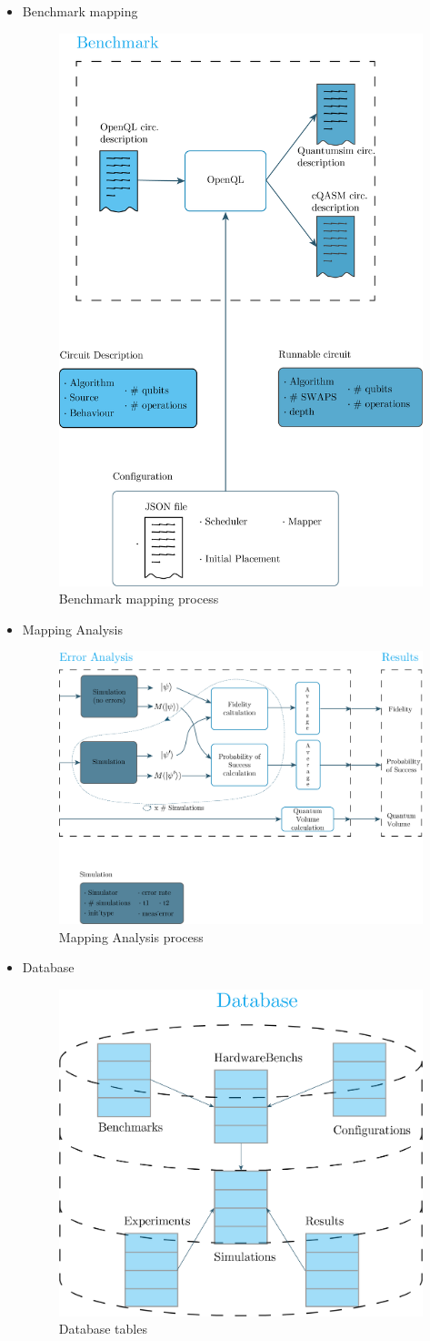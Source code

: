 \begin{itemize}
\item Benchmark mapping
\label{sec:org53f1364}

\begin{figure}[htbp]
\centering
\includegraphics[width=.5\textwidth]{figures/benchmark_object.png}
\caption{\label{fig:org5e30ca0}
Benchmark mapping process}
\end{figure}

\item Mapping Analysis
\label{sec:orgee2a61e}

\begin{figure}[htbp]
\centering
\includegraphics[width=.75\textwidth]{figures/error_analysis.png}
\caption{\label{fig:org0035d0a}
Mapping Analysis process}
\end{figure}

\item Database
\label{sec:orgd2ffbc2}

\begin{figure}[htbp]
\centering
\includegraphics[width=.5\textwidth]{figures/database_scheme_detail.png}
\caption{\label{fig:org844f2b9}
Database tables}
\end{figure}
\end{itemize}
